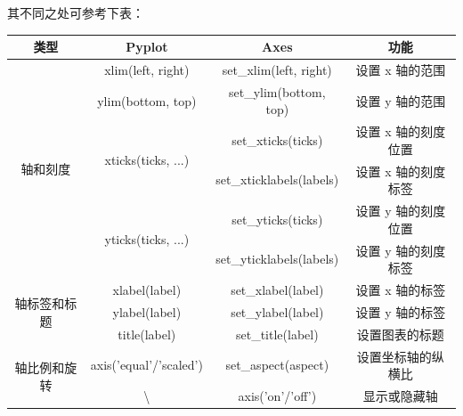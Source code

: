 \documentclass[12pt]{article}
\begin{document}
其不同之处可参考下表：
\begin{table}[H]
\begin{tabular}{cccc}
\hline
\multicolumn{1}{|c|}{类型}                      & \multicolumn{1}{c|}{Pyplot}                              & \multicolumn{1}{c|}{Axes}                     & \multicolumn{1}{c|}{功能}          \\ \hline
\multicolumn{1}{|c|}{\multirow{6}{*}{轴和刻度}}   & \multicolumn{1}{c|}{xlim(left, right)}                   & \multicolumn{1}{c|}{set\_xlim(left, right)}   & \multicolumn{1}{c|}{设置 x 轴的范围}   \\ \cline{2-4} 
\multicolumn{1}{|c|}{}                        & \multicolumn{1}{c|}{ylim(bottom, top)}                   & \multicolumn{1}{c|}{set\_ylim(bottom, top)}   & \multicolumn{1}{c|}{设置 y 轴的范围}   \\ \cline{2-4} 
\multicolumn{1}{|c|}{}                        & \multicolumn{1}{c|}{\multirow{2}{*}{xticks(ticks, ...)}} & \multicolumn{1}{c|}{set\_xticks(ticks)}       & \multicolumn{1}{c|}{设置 x 轴的刻度位置} \\ \cline{3-4} 
\multicolumn{1}{|c|}{}                        & \multicolumn{1}{c|}{}                                    & \multicolumn{1}{c|}{set\_xticklabels(labels)} & \multicolumn{1}{c|}{设置 x 轴的刻度标签} \\ \cline{2-4} 
\multicolumn{1}{|c|}{}                        & \multicolumn{1}{c|}{\multirow{2}{*}{yticks(ticks, ...)}} & \multicolumn{1}{c|}{set\_yticks(ticks)}       & \multicolumn{1}{c|}{设置 y 轴的刻度位置} \\ \cline{3-4} 
\multicolumn{1}{|c|}{}                        & \multicolumn{1}{c|}{}                                    & \multicolumn{1}{c|}{set\_yticklabels(labels)} & \multicolumn{1}{c|}{设置 y 轴的刻度标签} \\ \hline
\multicolumn{1}{|c|}{\multirow{3}{*}{轴标签和标题}} & \multicolumn{1}{c|}{xlabel(label)}                       & \multicolumn{1}{c|}{set\_xlabel(label)}       & \multicolumn{1}{c|}{设置 x 轴的标签}   \\ \cline{2-4} 
\multicolumn{1}{|c|}{}                        & \multicolumn{1}{c|}{ylabel(label)}                       & \multicolumn{1}{c|}{set\_ylabel(label)}       & \multicolumn{1}{c|}{设置 y 轴的标签}   \\ \cline{2-4} 
\multicolumn{1}{|c|}{}                        & \multicolumn{1}{c|}{title(label)}                        & \multicolumn{1}{c|}{set\_title(label)}        & \multicolumn{1}{c|}{设置图表的标题}     \\ \hline
\multicolumn{1}{|c|}{\multirow{2}{*}{轴比例和旋转}} & \multicolumn{1}{c|}{axis('equal'/'scaled')}              & \multicolumn{1}{c|}{set\_aspect(aspect)}      & \multicolumn{1}{c|}{设置坐标轴的纵横比}   \\ \cline{2-4} 
\multicolumn{1}{|c|}{}                        & \multicolumn{1}{c|}{\textbackslash{}}                    & \multicolumn{1}{c|}{axis('on'/'off')}         & \multicolumn{1}{c|}{显示或隐藏轴}      \\ \hline         
\end{tabular}
\end{table}
\end{document}

